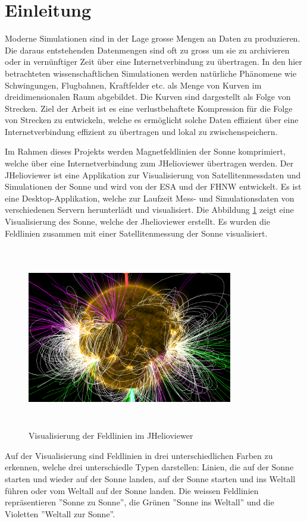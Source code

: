 \section{Einleitung}\label{einleitung}
Moderne Simulationen sind in der Lage grosse Mengen an Daten zu produzieren. Die daraus entstehenden Datenmengen sind oft zu gross um sie zu archivieren oder in vernünftiger Zeit über eine Internetverbindung zu übertragen. In den hier betrachteten wissenschaftlichen Simulationen werden natürliche Phänomene wie Schwingungen, Flugbahnen, Kraftfelder etc. als Menge von Kurven im dreidimensionalen Raum abgebildet. Die Kurven sind dargestellt als Folge von Strecken. Ziel der Arbeit ist es eine verlustbehaftete Kompression für die Folge von Strecken zu entwickeln, welche es ermöglicht solche Daten effizient über eine Internetverbindung effizient zu übertragen und lokal zu zwischenspeichern.

Im Rahmen dieses Projekts werden Magnetfeldlinien der Sonne komprimiert, welche über eine Internetverbindung zum JHelioviewer übertragen werden. Der JHelioviewer ist eine Applikation zur Visualisierung von Satellitenmessdaten und Simulationen der Sonne und wird von der ESA und der FHNW entwickelt. Es ist eine Desktop-Applikation, welche zur Laufzeit Mess- und Simulationsdaten von verschiedenen Servern herunterlädt und visualisiert. Die Abbildung \ref{einleitung::feldlinien} zeigt eine Visualisierung des Sonne, welche der Jhelioviewer erstellt. Es wurden die Feldlinien zusammen mit einer Satellitenmessung der Sonne visualisiert.

\begin{figure}[!htbp]
\center
	\includegraphics[width=0.8\textwidth,height=8cm,keepaspectratio]{./pictures/einleitung/fieldLines.png}
	\caption{Visualisierung der Feldlinien im JHelioviewer}
	\label{einleitung::feldlinien}
\end{figure}
Auf der Visualisierung sind Feldlinien in drei unterschiedlichen Farben zu erkennen, welche drei unterschiedle Typen darstellen: Linien, die auf der Sonne starten und wieder auf der Sonne landen, auf der Sonne starten und ins Weltall führen oder vom Weltall auf der Sonne landen. Die weissen Feldlinien repräsentieren ''Sonne zu Sonne'', die Grünen ''Sonne ins Weltall'' und die Violetten ''Weltall zur Sonne''.

